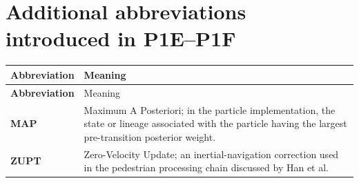 \section*{Additional abbreviations introduced in P1E--P1F}
\begin{longtable}{>{\bfseries}p{}p{}}
\toprule
Abbreviation & Meaning\\
\midrule
\endfirsthead
\toprule
Abbreviation & Meaning\\
\midrule
\endhead
MAP & Maximum A Posteriori; in the particle implementation, the state or lineage associated with the particle having the largest pre-transition posterior weight.\\
ZUPT & Zero-Velocity Update; an inertial-navigation correction used in the pedestrian processing chain discussed by Han et al.\\
\bottomrule
\end{longtable}

